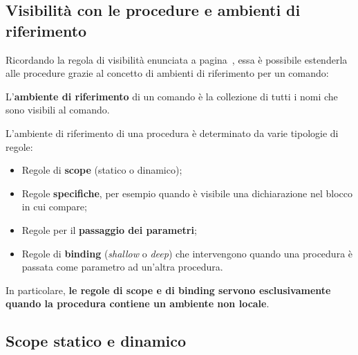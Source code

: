 \documentclass[a4paper]{article}
\begin{document}
 	\subsection{Visibilità con le procedure e ambienti di riferimento}
 	
 	Ricordando la regola di visibilità enunciata a pagina~\pageref{regola di visibilità}, essa è possibile estenderla alle procedure grazie al concetto di ambienti di riferimento per un comando:
 	\begin{boxdef}
 		L'\textcolor{Red3}{\textbf{ambiente di riferimento}} di un comando è la collezione di tutti i nomi che sono visibili al comando.
 	\end{boxdef}
 	
 	\noindent
 	L'ambiente di riferimento di una procedura è determinato da varie tipologie di regole:
 	\begin{itemize}
 		\item Regole di \textbf{scope} (statico o dinamico);
 		
 		\item Regole \textbf{specifiche}, per esempio quando è visibile una dichiarazione nel blocco in cui compare;
 		
 		\item Regole per il \textbf{passaggio dei parametri};
 		
 		\item Regole di \textbf{binding} (\emph{shallow} o \emph{deep}) che intervengono quando una procedura è passata come parametro ad un'altra procedura.
 	\end{itemize}
 	In particolare, \textbf{le regole di scope e di binding servono esclusivamente quando la procedura contiene un ambiente non locale}.\newpage
 	
 	\subsection{Scope statico e dinamico}
 	
\end{document}
